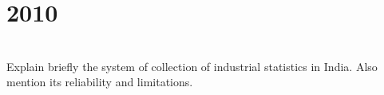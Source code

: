\section*{2010}
\vspace{-.5cm}
\hrulefill \smallskip\\
 Explain briefly the system of collection of industrial statistics in India. Also mention its reliability and limitations.
